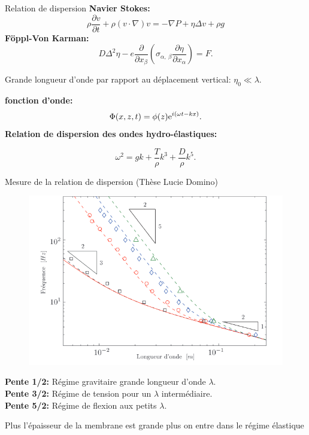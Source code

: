 \documentclass[aspectratio=169,a4paper,10pt]{beamer}
\begin{document}
\begin{frame}{Relation de dispersion }
\noindent \textbf{Navier Stokes:}
\begin{equation}
  \rho \dfrac{\partial v}{\partial t}  + \rho (v \cdot \nabla )v = -\nabla P + \eta \Delta v + \rho g
\end{equation}
\noindent \textbf{Föppl-Von Karman:}
\begin{equation}
  D\Delta^2\eta - e\dfrac{\partial }{\partial x_\beta}\left(\sigma_{\alpha,~\beta}\dfrac{\partial \eta}{\partial x_{\alpha}}\right) = F.
\end{equation}
\begin{center}
\noindent Grande longueur d'onde par rapport au déplacement vertical: $\eta_0 \ll \lambda.$\\
\end{center}
\noindent \textbf{fonction d'onde:}
\begin{equation}
  \Phi(x,z,t) = \phi(z){\rm e}^{i(\omega t -kx)}.
\end{equation}
\noindent \textbf{Relation de dispersion des ondes hydro-élastiques:}
\begin{ombredef}
  \begin{defi}
    \begin{equation}
      \omega^2 = gk + \dfrac{T}{\rho}k^3 + \dfrac{D}{\rho}k^5.
    \end{equation}  
  \end{defi}
\end{ombredef}
\end{frame}

\begin{frame}{Mesure de la relation de dispersion (Thèse Lucie Domino)}

\begin{figure}
  \centering
  \includegraphics[width = .5\textwidth]{./figures/Lucie_Domino.png}
\end{figure}
\centering
\begin{ombretheo}
  \begin{theo}
    \textbf{Pente 1/2:} Régime gravitaire grande longueur d'onde $\lambda$.\\
    \textbf{Pente 3/2:} Régime de tension pour un $\lambda$ intermédiaire.\\
    \textbf{Pente 5/2:} Régime de flexion aux petits $\lambda$.  
  \end{theo}
\end{ombretheo}
Plus l'épaisseur de la membrane est grande plus on entre dans le régime élastique
\end{frame}
\end{document}
